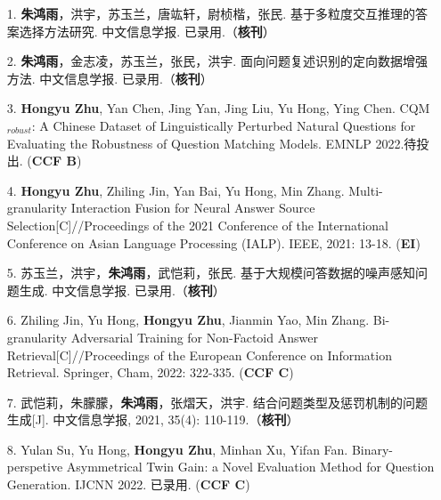 \begin{enumerate}[itemsep=0.7em, leftmargin=2em, itemindent=0em,labelwidth=2em]
	\item[1.] \textbf{朱鸿雨}，洪宇，苏玉兰，唐竑轩，尉桢楷，张民. 基于多粒度交互推理的答案选择方法研究. 中文信息学报. 已录用.（\textbf{核刊}）
	\item[2.] \textbf{朱鸿雨}，金志凌，苏玉兰，张民，洪宇. 面向问题复述识别的定向数据增强方法. 中文信息学报. 已录用.（\textbf{核刊}）
	\item[3.] \textbf{Hongyu Zhu}, Yan Chen, Jing Yan, Jing Liu, Yu Hong, Ying Chen. CQM$_{robust}$: A Chinese Dataset of Linguistically Perturbed Natural Questions for Evaluating the Robustness of Question Matching Models. EMNLP 2022.待投出. (\textbf{CCF B})
	\item[4.] \textbf{Hongyu Zhu}, Zhiling Jin, Yan Bai, Yu Hong, Min Zhang. Multi-granularity Interaction Fusion for Neural Answer Source Selection[C]//Proceedings of the 2021 Conference of the International Conference on Asian Language Processing (IALP). IEEE, 2021: 13-18. (\textbf{EI})
	\item[5.] 苏玉兰，洪宇，\textbf{朱鸿雨}，武恺莉，张民. 基于大规模问答数据的噪声感知问题生成. 中文信息学报. 已录用.（\textbf{核刊}）
	\item[6.] Zhiling Jin, Yu Hong, \textbf{Hongyu Zhu}, Jianmin Yao, Min Zhang. Bi-granularity Adversarial Training for Non-Factoid Answer Retrieval[C]//Proceedings of the European Conference on Information Retrieval. Springer, Cham, 2022: 322-335. (\textbf{CCF C})
	\item[7.] 武恺莉，朱朦朦，\textbf{朱鸿雨}，张熠天，洪宇. 结合问题类型及惩罚机制的问题生成[J]. 中文信息学报, 2021, 35(4): 110-119.（\textbf{核刊}）
	\item[8.] Yulan Su, Yu Hong, \textbf{Hongyu Zhu}, Minhan Xu, Yifan Fan. Binary-perspetive Asymmetrical Twin Gain: a Novel Evaluation Method for Question Generation. IJCNN 2022. 已录用. (\textbf{CCF C})
\end{enumerate}
